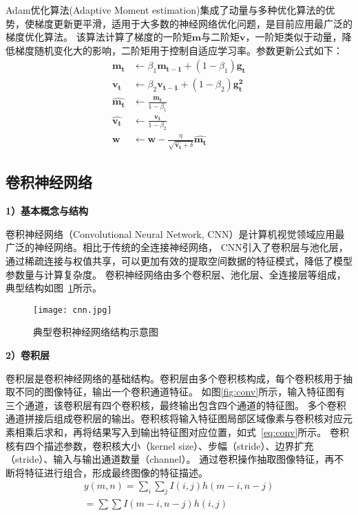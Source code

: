 Adam优化算法(Adaptive Moment estimation)\cite{kingma2020method}集成了动量与多种优化算法的优势，使梯度更新更平滑，适用于大多数的神经网络优化问题，是目前应用最广泛的梯度优化算法。
该算法计算了梯度的一阶矩$\boldsymbol{m}$与二阶矩$\boldsymbol{v}$，一阶矩类似于动量，降低梯度随机变化大的影响，二阶矩用于控制自适应学习率。参数更新公式如下：
\begin{equation}
  \begin{aligned}
    \boldsymbol{m_t}  & \leftarrow  \beta_1 \boldsymbol{m_{t-1}}  + (1 - \beta_1) \boldsymbol{g_t} \\
    \boldsymbol{v_t}  & \leftarrow  \beta_2 \boldsymbol{v_{t-1}}  + (1 - \beta_2) \boldsymbol{g_t^2} \\
    \boldsymbol{\hat{m_t}} &  \leftarrow \frac{\boldsymbol{m_t}}{1 - \beta_1} \\
    \boldsymbol{\hat{v_t}} &  \leftarrow \frac{\boldsymbol{v_t}}{1 - \beta_2} \\
    \boldsymbol{w}  & \leftarrow  \boldsymbol{w} - \frac{\eta}{\sqrt{\boldsymbol{\hat{v_t}} + \delta}} \boldsymbol{\hat{m_t}}
  \end{aligned}
  \label{eq:Adam}
\end{equation}




\subsection{卷积神经网络}

\textbf{1）基本概念与结构}

卷积神经网络（Convolutional Neural Network, CNN）\cite{li2021survey}是计算机视觉领域应用最广泛的神经网络。相比于传统的全连接神经网络，
CNN引入了卷积层与池化层，通过稀疏连接与权值共享，可以更加有效的提取空间数据的特征模式，降低了模型参数量与计算复杂度。
卷积神经网络由多个卷积层、池化层、全连接层等组成，典型结构如图~\ref{fig:cnn}所示。

\begin{figure}[htbp]
  \centering
  \texttt{[image: cnn.jpg]}
  \caption{典型卷积神经网络结构示意图}
  \label{fig:cnn}
\end{figure}

\textbf{2）卷积层}

卷积层是卷积神经网络的基础结构。卷积层由多个卷积核构成，每个卷积核用于抽取不同的图像特征，输出一个卷积通道特征。
如图\ref{fig:conv}所示，输入特征图有三个通道，该卷积层有四个卷积核，最终输出包含四个通道的特征图。
多个卷积通道拼接后组成卷积层的输出。卷积核将输入特征图局部区域像素与卷积核对应元素相乘后求和，再将结果写入到输出特征图对应位置，如式~\ref{eq:conv}所示。
卷积核有四个描述参数，卷积核大小（kernel size）、步幅（stride）、边界扩充（stride）、输入与输出通道数量（channel）。
通过卷积操作抽取图像特征，再不断将特征进行组合，形成最终图像的特征描述。
\begin{equation}
  \begin{array}{l}
    y(m, n)=\sum_{i} \sum_{j} I(i, j) h(m-i, n-j) \\
    =\sum \sum I(m-i, n-j) h(i, j)
    \end{array}
  \label{eq:conv}
\end{equation}

